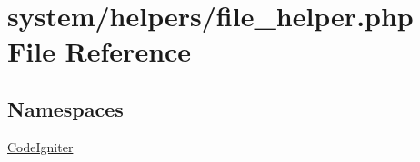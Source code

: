 \hypertarget{file__helper_8php}{\section{system/helpers/file\-\_\-helper.php File Reference}
\label{file__helper_8php}
}
\subsection*{Namespaces}
\begin{DoxyCompactItemize}
\item 
\hyperlink{namespace_code_igniter}{Code\-Igniter}
\end{DoxyCompactItemize}
